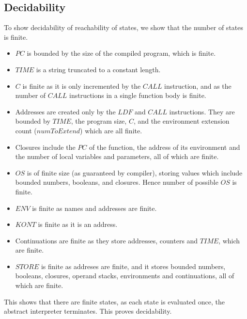 \documentclass[12pt]{article}
\begin{document}
\subsection{Decidability}
To show decidability of reachability of states, we show that the number of states is finite. 
\begin{itemize}
  \item $PC$ is bounded by the size of the compiled program, which is finite.
        
  \item $TIME$ is a string truncated to a constant length.
        
  \item $C$ is finite as it is only incremented by the $CALL$ instruction, and as the number of $CALL$ instructions in a single function body is finite.
        
  \item Addresses are created only by the $LDF$ and $CALL$ instructions. They are bounded by $TIME$, the program size, $C$, and the environment extension count ($numToExtend$) which are all finite.
        
  \item Closures include the $PC$ of the function, the address of its environment and the number of local variables and parameters, all of which are finite.
        
  \item $OS$ is of finite size (as guaranteed by compiler), storing values which include bounded numbers, booleans, and closures. Hence number of possible $OS$ is finite.
        
  \item $ENV$ is finite as names and addresses are finite.
        
  \item $KONT$ is finite as it is an address.
        
  \item Continuations are finite as they store addresses, counters and $TIME$, which are finite.
        
  \item $STORE$ is finite as addreses are finite, and it stores bounded numbers, booleans, closures, operand stacks, environments and continuations, all of which are finite.
\end{itemize}

This shows that there are finite states, as each state is evaluated once, the abstract interpreter terminates. This proves decidability.
\end{document}
